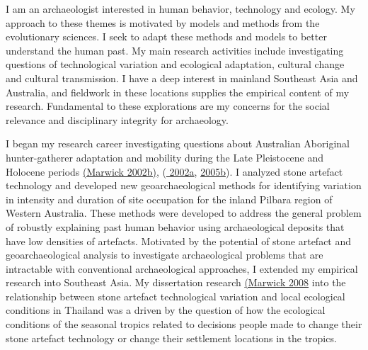 \documentclass[11pt,article,oneside]{memoir}
\begin{document}

\bigskip       


I am an archaeologist interested in human behavior, technology and ecology. My approach to these themes is motivated by models and methods from the evolutionary sciences. I seek to adapt these methods and models to better understand the human past. My main research activities include investigating questions of technological variation and ecological adaptation, cultural change and cultural transmission. I have a deep interest in mainland Southeast Asia and Australia, and fieldwork in these locations supplies the empirical content of my research. Fundamental to these explorations are my concerns for the social relevance and disciplinary integrity for archaeology.

I began my research career investigating questions about Australian Aboriginal hunter-gatherer adaptation and mobility during the Late Pleistocene and Holocene periods  {\href{http://dx.doi.org/10.6084/m9.figshare.765251}{(Marwick 2002b)}}, ({\href{http://hdl.handle.net/1885/42085}{ 2002a}}, {\href{http://faculty.washington.edu/bmarwick/PDFs/Marwick_2005_Marillana_A.pdf}{ 2005b}}). I analyzed stone artefact technology and developed new geoarchaeological methods for identifying variation in intensity and duration of site occupation for the inland Pilbara region of Western Australia. These methods were developed to address the general problem of robustly explaining past human behavior using archaeological deposits that have low densities of artefacts. Motivated by the potential of stone artefact and geoarchaeological analysis to investigate archaeological problems that are intractable with conventional archaeological approaches, I extended my empirical research into Southeast Asia. My dissertation research {\href{http://dx.doi.org/10.6084/m9.figshare.765252}{(Marwick 2008}} into the relationship between stone artefact technological variation and local ecological conditions in Thailand was a driven by the question of how the ecological conditions of the seasonal tropics related to decisions people made to change their stone artefact technology or change their settlement locations in the tropics. 
\end{document}
